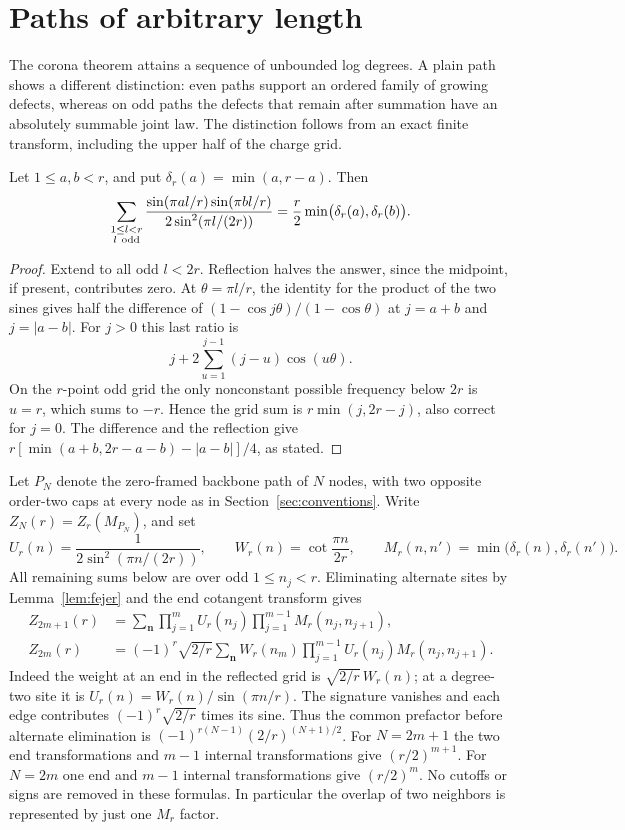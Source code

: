 \section{Paths of arbitrary length}\label{sec:paths}

The corona theorem attains a sequence of unbounded log degrees. A plain path shows a different distinction: even paths support an ordered family of growing defects, whereas on odd paths the defects that remain after summation have an absolutely summable joint law. The distinction follows from an exact finite transform, including the upper half of the charge grid.

\begin{lemma}\label{lem:fejer}
Let \(1\le a,b<r\), and put \(\delta_r(a)=\min(a,r-a)\). Then
\[
 \sum_{\substack{1\le l<r\\l\ {\rm odd}}}
 \frac{\sin(\pi al/r)\sin(\pi bl/r)}{2\sin^2(\pi l/(2r))}
     =\frac r2\min\bigl(\delta_r(a),\delta_r(b)\bigr).
\]
\end{lemma}
\begin{proof}
Extend to all odd \(l<2r\). Reflection halves the answer, since the midpoint, if present, contributes zero. At \(\theta=\pi l/r\), the identity for the product of the two sines gives half the difference of \((1-\cos j\theta)/(1-\cos\theta)\) at \(j=a+b\) and \(j=|a-b|\). For \(j>0\) this last ratio is
\[
 j+2\sum_{u=1}^{j-1}(j-u)\cos(u\theta).
\]
On the \(r\)-point odd grid the only nonconstant possible frequency below \(2r\) is \(u=r\), which sums to \(-r\). Hence the grid sum is \(r\min(j,2r-j)\), also correct for \(j=0\). The difference and the reflection give \(r[\min(a+b,2r-a-b)-|a-b|]/4\), as stated.
\end{proof}

Let \(P_N\) denote the zero-framed backbone path of \(N\) nodes, with two opposite order-two caps at every node as in Section~\ref{sec:conventions}. Write \(Z_N(r)=Z_r(M_{P_N})\), and set
\[
 U_r(n)=\frac1{2\sin^2(\pi n/(2r))},\qquad
 W_r(n)=\cot\frac{\pi n}{2r},\qquad
 M_r(n,n')=\min\bigl(\delta_r(n),\delta_r(n')\bigr).
\]
All remaining sums below are over odd \(1\le n_j<r\). Eliminating alternate sites by Lemma~\ref{lem:fejer} and the end cotangent transform gives
\begin{align}
 Z_{2m+1}(r)&=\sum_{\boldsymbol n}
      \prod_{j=1}^m U_r(n_j)\prod_{j=1}^{m-1}M_r(n_j,n_{j+1}), \label{eq:oddexact}\\
 Z_{2m}(r)&=(-1)^r\sqrt{2/r}\sum_{\boldsymbol n}
       W_r(n_m)\prod_{j=1}^{m-1}U_r(n_j)M_r(n_j,n_{j+1}). \label{eq:evenexact}
\end{align}
Indeed the weight at an end in the reflected grid is \(\sqrt{2/r}\,W_r(n)\); at a degree-two site it is \(U_r(n)=W_r(n)/\sin(\pi n/r)\). The signature vanishes and each edge contributes \((-1)^r\sqrt{2/r}\) times its sine. Thus the common prefactor before alternate elimination is \((-1)^{r(N-1)}(2/r)^{(N+1)/2}\). For \(N=2m+1\) the two end transformations and \(m-1\) internal transformations give \((r/2)^{m+1}\). For \(N=2m\) one end and \(m-1\) internal transformations give \((r/2)^m\). No cutoffs or signs are removed in these formulas. In particular the overlap of two neighbors is represented by just one \(M_r\) factor.

